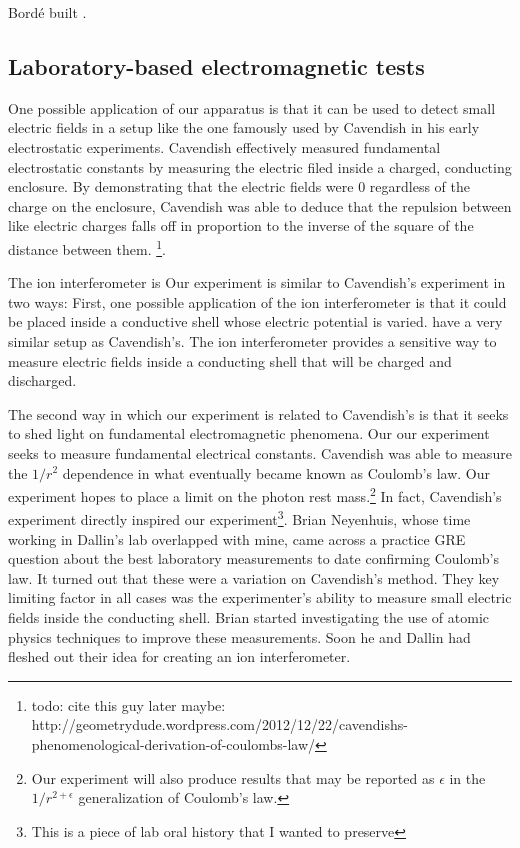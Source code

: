 Bord\'e built \cite{borde_interferometer}.

\subsection{Laboratory-based electromagnetic tests}

One possible application of our apparatus is that it can be used  to detect small electric fields in a setup like the one famously used by Cavendish in his early electrostatic experiments. Cavendish effectively measured fundamental electrostatic constants by measuring the electric filed inside a charged, conducting enclosure. By demonstrating that the electric fields were 0 regardless of the charge on the enclosure, Cavendish was able to deduce that the repulsion between like electric charges falls off in proportion to the inverse of the square of the distance between them. \footnote{todo: cite this guy later maybe:  http://geometrydude.wordpress.com/2012/12/22/cavendishs-phenomenological-derivation-of-coulombs-law/}. 

The ion interferometer is Our experiment is similar to Cavendish's experiment in two ways: First, one possible application of the ion interferometer is that it could be placed inside a conductive shell whose electric potential is varied. have a very similar setup as Cavendish's. The ion interferometer provides a sensitive way to measure electric fields inside a conducting shell that will be charged and discharged. 

The second way in which our experiment is related to Cavendish's is that it seeks to shed light on fundamental electromagnetic phenomena. Our our experiment seeks to measure fundamental electrical constants. Cavendish was able to measure the $1/r^2$ dependence in what eventually became known as Coulomb's law. Our experiment hopes to place a limit on the photon rest mass.\footnote{Our experiment will also produce results that may be reported as $\epsilon$ in the $1/r^{2+\epsilon}$ generalization of Coulomb's law.}
In fact, Cavendish's experiment directly inspired our experiment\footnote{This is a piece of lab oral history that I wanted to preserve}. Brian Neyenhuis, whose time working in Dallin's lab overlapped with mine, came across a practice GRE question about the best laboratory measurements to date confirming Coulomb's law. It turned out that these were a variation on Cavendish's method. They key limiting factor in all cases was the experimenter's ability to measure small electric fields inside the conducting shell. Brian started investigating the use of atomic physics techniques to improve these measurements. Soon he and Dallin had fleshed out their idea for creating an ion interferometer.  

